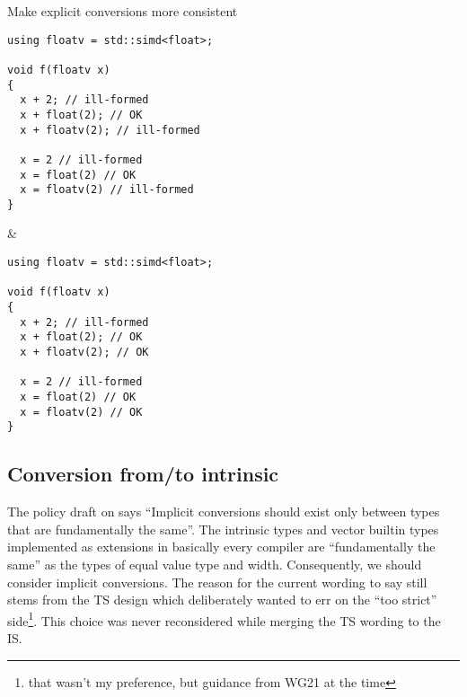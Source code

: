 \begin{tonytable}{Make explicit conversions more consistent}
  \begin{lstlisting}
using floatv = std::simd<float>;

void f(floatv x)
{
  x + 2; // ill-formed
  x + float(2); // OK
  x + floatv(2); // ill-formed

  x = 2 // ill-formed
  x = float(2) // OK
  x = floatv(2) // ill-formed
}
  \end{lstlisting}
  &
  \begin{lstlisting}
using floatv = std::simd<float>;

void f(floatv x)
{
  x + 2; // ill-formed
  x + float(2); // OK
  x + floatv(2); // OK

  x = 2 // ill-formed
  x = float(2) // OK
  x = floatv(2) // OK
}
  \end{lstlisting}
\end{tonytable}

\subsection{Conversion from/to intrinsic}\label{sec:intrinsics-conversion}

The policy draft on  says “Implicit conversions should exist only between types that
are fundamentally the same”.
The intrinsic types and vector builtin types implemented as extensions in basically every compiler
are “fundamentally the same” as the  types of equal value type and width.
Consequently, we should consider implicit conversions.
The reason for the current wording to say  still stems from the TS design which
deliberately wanted to err on the “too strict” side\footnote{that wasn't my preference, but guidance
from WG21 at the time}.
This choice was never reconsidered while merging the TS wording to the IS.

